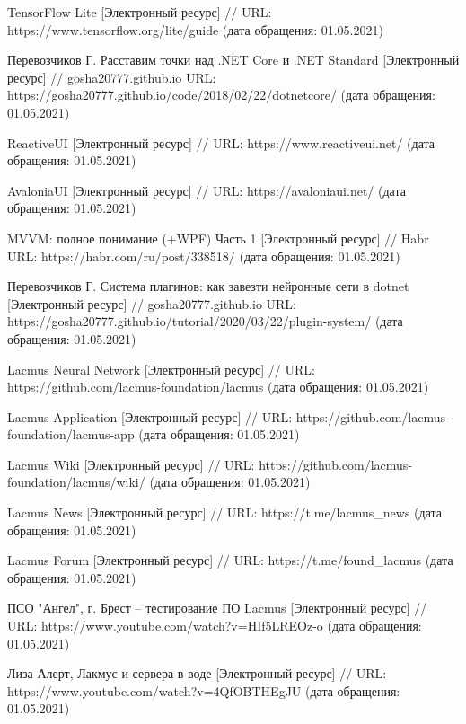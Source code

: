 \begin{thebibliography}{00}
    TensorFlow Lite
    [Электронный ресурс] //
    URL: https://www.tensorflow.org/lite/guide
    (дата обращения: 01.05.2021)

    Перевозчиков Г. 
    Расставим точки над .NET Core и .NET Standard
    [Электронный ресурс] //
    gosha20777.github.io
    URL: https://gosha20777.github.io/code/2018/02/22/dotnetcore/
    (дата обращения: 01.05.2021)

    ReactiveUI
    [Электронный ресурс] //
    URL: https://www.reactiveui.net/
    (дата обращения: 01.05.2021)    

    AvaloniaUI
    [Электронный ресурс] //
    URL: https://avaloniaui.net/
    (дата обращения: 01.05.2021)

    MVVM: полное понимание (+WPF) Часть 1
    [Электронный ресурс] //
    Habr
    URL: https://habr.com/ru/post/338518/
    (дата обращения: 01.05.2021)
    
    Перевозчиков Г. 
    Система плагинов: как завезти нейронные сети в dotnet
    [Электронный ресурс] //
    gosha20777.github.io
    URL: https://gosha20777.github.io/tutorial/2020/03/22/plugin-system/
    (дата обращения: 01.05.2021)
    
    Lacmus Neural Network
    [Электронный ресурс] //
    URL: https://github.com/lacmus-foundation/lacmus
    (дата обращения: 01.05.2021)

    Lacmus Application
    [Электронный ресурс] //
    URL: https://github.com/lacmus-foundation/lacmus-app
    (дата обращения: 01.05.2021)

    Lacmus Wiki
    [Электронный ресурс] //
    URL: https://github.com/lacmus-foundation/lacmus/wiki/
    (дата обращения: 01.05.2021)    
    
    Lacmus News
    [Электронный ресурс] //
    URL: https://t.me/lacmus\_news
    (дата обращения: 01.05.2021) 
    
    Lacmus Forum
    [Электронный ресурс] //
    URL: https://t.me/found\_lacmus
    (дата обращения: 01.05.2021)

    ПСО "Ангел", г. Брест -- тестирование ПО Lacmus
    [Электронный ресурс] //
    URL: https://www.youtube.com/watch?v=HIf5LREOz-o
    (дата обращения: 01.05.2021)
    
    Лиза Алерт, Лакмус и сервера в воде
    [Электронный ресурс] //
    URL: https://www.youtube.com/watch?v=4QfOBTHEgJU
    (дата обращения: 01.05.2021)


\end{thebibliography}
